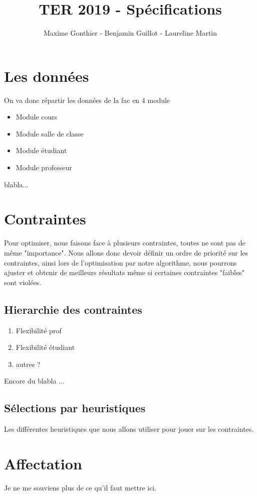 \documentclass[a4paper,11pt]{article}
\title{TER 2019 - Spécifications}
\author{Maxime Gonthier - Benjamin Guillot - Laureline Martin}
\begin{document}
	\clearpage
	\maketitle

\newpage
\section{Les données}
	On va donc répartir les données de la fac en 4 module\\
	\begin{itemize}
		\item Module cours
		\item Module salle de classe
		\item Module étudiant
		\item Module professeur
	\end{itemize}
	blabla...\\
\section{Contraintes}
	Pour optimiser, nous faisons face à plusieurs contraintes, toutes ne sont pas 
	de même "importance". Nous allons donc devoir définir un ordre de priorité sur 
	les contraintes, ainsi lors de l'optimisation par notre algorithme, nous 
	pourrons ajuster et obtenir de meilleurs résultats même si certaines contraintes
	"faibles" sont violées.\\
	\subsection{Hierarchie des contraintes}
		\begin{enumerate}
			\item Flexibilité prof
			\item Flexibilité étudiant
			\item autres ?
		\end{enumerate}
	Encore du blabla ...\\
	\subsection{Sélections par heuristiques}
		Les différentes heuristiques que nous allons utiliser pour jouer sur les 
		contraintes. \\
\section{Affectation}
	Je ne me souviens plus de ce qu'il faut mettre ici. \\
\end{document}
